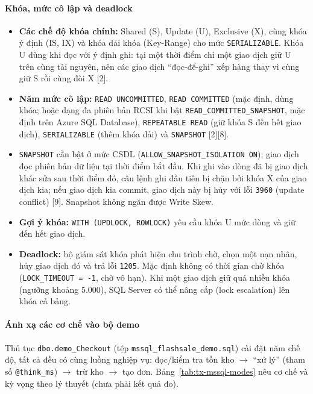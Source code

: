 \paragraph{Khóa, mức cô lập và deadlock}\mbox{}

\begin{itemize}
    \item \textbf{Các chế độ khóa chính:} Shared (S), Update (U), Exclusive (X), cùng khóa ý định (IS, IX) và khóa dải khóa (Key-Range) cho mức \texttt{SERIALIZABLE}. Khóa U dùng khi đọc với ý định ghi: tại một thời điểm chỉ một giao dịch giữ U trên cùng tài nguyên, nên các giao dịch ``đọc-để-ghi'' xếp hàng thay vì cùng giữ S rồi cùng đòi X [2].
    \item \textbf{Năm mức cô lập:} \texttt{READ UNCOMMITTED}, \texttt{READ COMMITTED} (mặc định, dùng khóa; hoặc dạng đa phiên bản RCSI khi bật \texttt{READ\_COMMITTED\_SNAPSHOT}, mặc định trên Azure SQL Database), \texttt{REPEATABLE READ} (giữ khóa S đến hết giao dịch), \texttt{SERIALIZABLE} (thêm khóa dải) và \texttt{SNAPSHOT} [2][8].
    \item \texttt{SNAPSHOT} cần bật ở mức CSDL (\texttt{ALLOW\_SNAPSHOT\_ISOLATION ON}); giao dịch đọc phiên bản dữ liệu tại thời điểm bắt đầu. Khi ghi vào dòng đã bị giao dịch khác sửa sau thời điểm đó, câu lệnh ghi đầu tiên bị chặn bởi khóa X của giao dịch kia; nếu giao dịch kia commit, giao dịch này bị hủy với lỗi \texttt{3960} (update conflict) [9]. Snapshot không ngăn được Write Skew.
    \item \textbf{Gợi ý khóa:} \texttt{WITH (UPDLOCK, ROWLOCK)} yêu cầu khóa U mức dòng và giữ đến hết giao dịch.
    \item \textbf{Deadlock:} bộ giám sát khóa phát hiện chu trình chờ, chọn một nạn nhân, hủy giao dịch đó và trả lỗi \texttt{1205}. Mặc định không có thời gian chờ khóa (\texttt{LOCK\_TIMEOUT = -1}, chờ vô hạn). Khi một giao dịch giữ quá nhiều khóa (ngưỡng khoảng 5.000), SQL Server có thể nâng cấp (lock escalation) lên khóa cả bảng.
\end{itemize}

\paragraph{Ánh xạ các cơ chế vào bộ demo}\mbox{}

Thủ tục \texttt{dbo.demo\_Checkout} (tệp \texttt{mssql\_flashsale\_demo.sql}) cài đặt năm chế độ, tất cả đều có cùng luồng nghiệp vụ: đọc/kiểm tra tồn kho $\rightarrow$ ``xử lý'' (tham số \texttt{@think\_ms}) $\rightarrow$ trừ kho $\rightarrow$ tạo đơn. Bảng~\ref{tab:tx-mssql-modes} nêu cơ chế và kỳ vọng theo lý thuyết (chưa phải kết quả đo).

